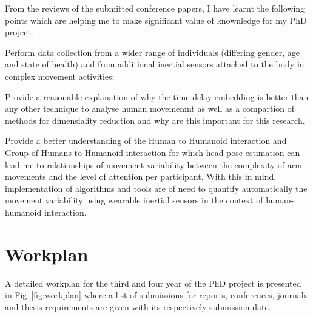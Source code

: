 \documentclass{sigchi}
\begin{document}
From the reviews of the submitted conference papers, I have learnt the following
points which are helping me to make significant value of knownledge for
my PhD project.

\begin{description}
  \setlength{\itemsep}{0pt}
  \setlength{\parskip}{0pt}
  \item [(a)]Perform data collection from a wider range of individuals
  (differing gender, age and state of health) and from additional inertial sensors
  attached to the body in complex movement activities;

  \item [(b)] Provide a reasonable explanation of why the time-delay embedding is better
  than any other technique to analyse human movememnt as well as a compartion of
  methods for dimensiality reduction and why are this important for this research.

  \item [(c)] Provide a better understanding of the Human to Humanoid interaction and
  Group of Humans to Humanoid interaction
  for which head pose estimation can lead me to
  relationships of movement variability between the complexity of arm movements
  and the level of attention per participant. With this in mind,
  implementation of algorithms and tools are of need to quantify automatically
  the movement variability using wearable inertial sensors
  in the context of human-humanoid interaction.
\end{description}







\section{Workplan}
A detailed workplan for the third and four year of the PhD project is presented
in Fig~\ref{fig:workplan} where a list of submissions for reports, conferences,
journals and thesis requirements are given with its respectively submission date.
\end{document}
